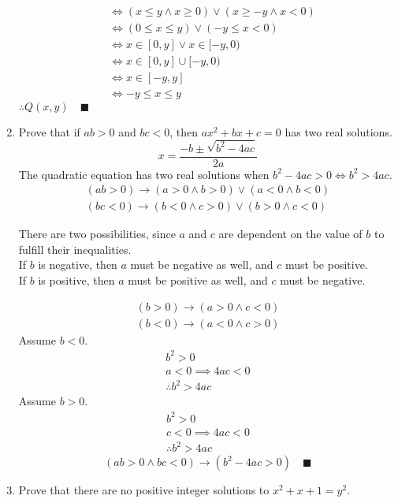 \documentclass[letterpaper, 12pt]{article}
\newcommand{\qed}{\quad \blacksquare}
\newcommand{\then}{\rightarrow}
\begin{document}
\begin{enumerate}
\begin{gather*}
\end{gather*}
\begin{align*}
    &\iff (x \le y \wedge x \ge 0) \vee (x \ge -y \wedge x < 0) \\
    &\iff (0 \le x \le y) \vee (-y \le x < 0) \\
    &\iff x \in [0, y] \vee x \in [-y, 0) \\
    &\iff x \in [0, y] \cup [-y, 0) \\
    &\iff x \in [-y, y] \\
    &\iff -y \le x \le y
\end{align*}
$\therefore Q(x, y) \qed$
\pagebreak
\item Prove that if $ab > 0$ and $bc < 0$, then $ax^2 + bx + c = 0$ has two real solutions.
\[x = \frac{-b \pm \sqrt{b^2 - 4ac}}{2a}\]
The quadratic equation has two real solutions when $b^2 - 4ac > 0 \iff b^2 > 4ac$.
\begin{gather*}
    (ab > 0) \then (a > 0 \wedge b > 0) \vee (a < 0 \wedge b < 0) \\
    (bc < 0) \then (b < 0 \wedge c > 0) \vee (b > 0 \wedge c < 0)
\end{gather*}
\begin{flushleft}
    There are two possibilities, since $a$ and $c$ are dependent on the value of $b$ to fulfill 
    their inequalities. \\ If $b$ is negative, then $a$ must be negative as well, and 
    $c$ must be positive. \\ If $b$ is positive, then $a$ must be positive as well, and $c$ 
    must be negative.
\end{flushleft}
\begin{gather*}
    (b > 0) \then (a > 0 \wedge c < 0) \\
    (b < 0) \then (a < 0 \wedge c > 0)
\end{gather*}
Assume $b < 0$.
\begin{gather*}
    b^2 > 0 \\
    a < 0 \implies 4ac < 0 \\
    \therefore b^2 > 4ac
\end{gather*}
Assume $b > 0$.
\begin{gather*}
    b^2 > 0 \\
    c < 0 \implies 4ac < 0 \\
    \therefore b^2 > 4ac
\end{gather*}
\[(ab > 0 \wedge bc < 0) \then (b^2 - 4ac > 0) \qed\]
\pagebreak
\item Prove that there are no positive integer solutions to $x^2 + x + 1 = y^2$.

\end{enumerate}
\end{document}
